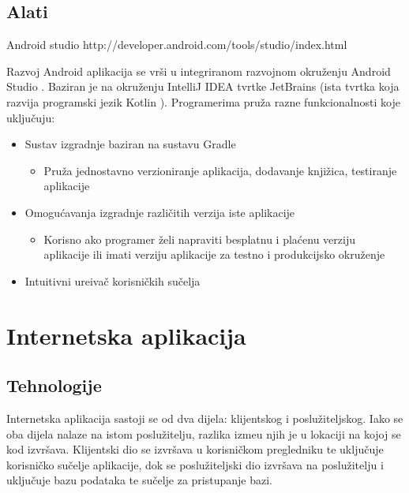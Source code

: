 \subsection{Alati}
Android studio
http://developer.android.com/tools/studio/index.html

Razvoj Android aplikacija se vr\v{s}i u integriranom razvojnom okru\v{z}enju Android Studio \cite{androidStudio}. Baziran je na okru\v{z}enju IntelliJ IDEA \cite{inteliJ} tvrtke JetBrains (ista tvrtka koja razvija programski jezik Kotlin \cite{kotlin}). Programerima pru\v{z}a razne funkcionalnosti koje uklju\v{c}uju:

\begin{itemize}
		\item Sustav izgradnje baziran na sustavu Gradle \cite{gradle}
		\begin{itemize}
			\item Pru\v{z}a jednostavno verzioniranje aplikacija, dodavanje knji\v{z}ica, testiranje aplikacije
		\end{itemize}
		\item Omogu\'{c}avanja izgradnje razli\v{c}itih verzija iste aplikacije
		\begin{itemize}
			\item Korisno ako programer \v{z}eli napraviti besplatnu i pla\'{c}enu verziju aplikacije ili imati verziju aplikacije za testno i produkcijsko okru\v{z}enje
		\end{itemize}
		\item Intuitivni ure\dj iva\v{c} korisni\v{c}kih su\v{c}elja
	\end{itemize}


\section{Internetska aplikacija}

\subsection{Tehnologije}

Internetska aplikacija sastoji se od dva dijela: klijentskog i poslu\v{z}iteljskog. Iako se oba dijela nalaze na istom poslu\v{z}itelju, razlika izme\dj u njih je u lokaciji na kojoj se kod izvr\v{s}ava. Klijentski dio se izvr\v{s}ava u korisni\v{c}kom pregledniku te uklju\v{c}uje korisni\v{c}ko su\v{c}elje aplikacije, dok se poslu\v{z}iteljski dio izvr\v{s}ava na poslu\v{z}itelju i uklju\v{c}uje bazu podataka te su\v{c}elje za pristupanje bazi.

